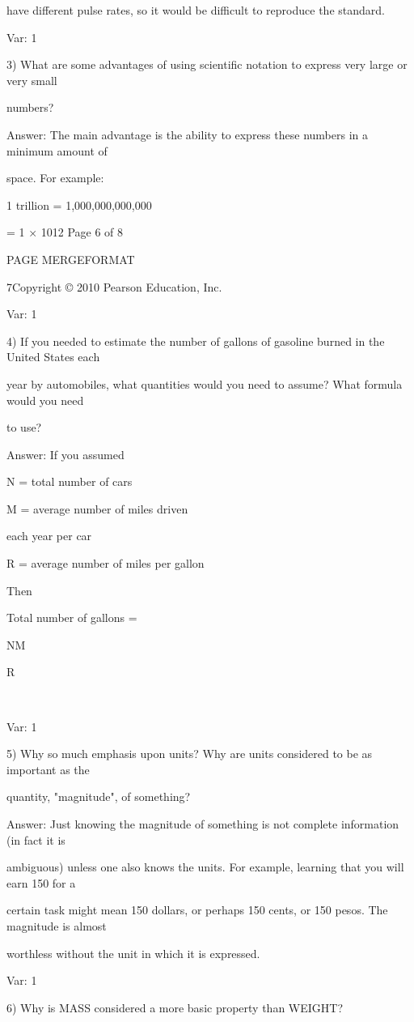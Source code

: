 have different pulse rates, so it would be difficult to reproduce the standard.

Var: 1

3) What are some advantages of using scientific notation to express very large or very small

numbers?

Answer: The main advantage is the ability to express these numbers in a minimum amount of

space. For example:

1 trillion = 1,000,000,000,000

= 1 × 1012
Page 6 of 8

PAGE \* MERGEFORMAT

7Copyright © 2010 Pearson Education, Inc.

Var: 1

4) If you needed to estimate the number of gallons of gasoline burned in the United States each

year by automobiles, what quantities would you need to assume? What formula would you need

to use?

Answer: If you assumed

N = total number of cars

M = average number of miles driven

each year per car

R = average number of miles per gallon

Then

Total number of gallons =

NM

R



Var: 1

5) Why so much emphasis upon units? Why are units considered to be as important as the

quantity, "magnitude", of something?

Answer: Just knowing the magnitude of something is not complete information (in fact it is

ambiguous) unless one also knows the units. For example, learning that you will earn 150 for a

certain task might mean 150 dollars, or perhaps 150 cents, or 150 pesos. The magnitude is almost

worthless without the unit in which it is expressed.

Var: 1

6) Why is MASS considered a more basic property than WEIGHT?

